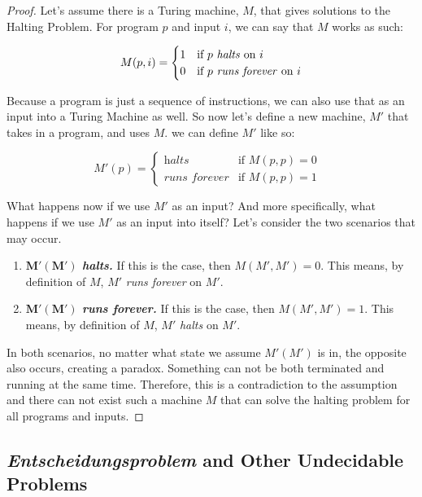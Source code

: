 \documentclass[11pt]{article}
\begin{document}
\begin{proof}
Let's assume there is a Turing machine, $M$, that gives solutions to the Halting Problem. For program $p$ and input $i$, we can say that $M$ works as such:

\[
M(p,i) =  
\begin{cases} 
      1 & \text{if $p$ \textit{halts} on $i$} \\
      0 & \text{if $p$ \textit{runs forever} on $i$}
   \end{cases}
\]

\noindent Because a program is just a sequence of instructions, we can also use that as an input into a Turing Machine as well. So now let's define a new machine, $M'$ that takes in a program, and uses $M$. we can define $M'$ like so:

\[
M'(p) =  
\begin{cases} 
      \textit{halts} & \text{if $M(p,p) = 0$ } \\
      \textit{runs forever} & \text{if $M(p,p) = 1$}
   \end{cases}
\]

\noindent What happens now if we use $M'$ as an input? And more specifically, what happens if we use $M'$ as an input into itself? Let's consider the two scenarios that may occur.

\begin{enumerate}

\item \textbf{$\boldsymbol{M'(M')}$ \textit{halts.}} If this is the case, then $M(M',M')=0$. This means, by definition of $M$, $M'$ \textit{runs forever} on $M'$.
\item \textbf{$\boldsymbol{M'(M')}$ \textit{runs forever.}} If this is the case, then $M(M',M')=1$. This means, by definition of $M$, $M'$ \textit{halts} on $M'$.

\end{enumerate}

In both scenarios, no matter what state we assume $M'(M')$ is in, the opposite also occurs, creating a paradox. Something can not be both terminated and running at the same time.  Therefore, this is a contradiction to the assumption and there can not exist such a machine $M$ that can solve the halting problem for all programs and inputs.
\end{proof}

\subsection{\textit{Entscheidungsproblem} and Other Undecidable Problems}
\end{document}
